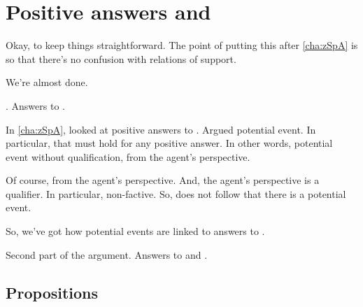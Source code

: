 \chapter{Positive answers and \qWhyV{}}
\label{cha:zSpAwhy}

\begin{note}
  \color{red}
  Okay, to keep things straightforward.
  The point of putting this after \autoref{cha:zSpA} is so that there's no confusion with relations of support.
\end{note}

\begin{note}
  We're almost done.

  \qzS{}.
  Answers to \qzS{}.

  In \autoref{cha:zSpA}, looked at positive answers to \qzS{}.
  Argued potential event.
  In particular, that \ptivity{} must hold for any positive answer.
  In other words, potential event without qualification, from the agent's perspective.

  Of course, from the agent's perspective.
  And, the agent's perspective is a qualifier.
  In particular, non-factive.
  So, does not follow that there is a potential event.
\end{note}

\begin{note}
  So, we've got how potential events are linked to answers to \qzS{}.

  Second part of the argument.
  Answers to \qzS{} and \qWhyV{}.
\end{note}

\section{Propositions}
\label{cha:zSpAwhy:sec:proposition}

